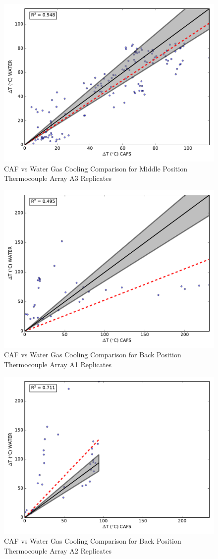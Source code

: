 \documentclass[12pt,oneside]{book}
\begin{document}
\begin{figure}[!ht]
	\includegraphics[width=.7\columnwidth]{../Figures/Gas_Cooling/Combined_mid_A3_scatter}
	\caption{CAF vs Water Gas Cooling Comparison for Middle Position Thermocouple Array A3 Replicates}
	\label{fig:CAFS_Water_A3_mid}
\end{figure}

\begin{figure}[!ht]
	\includegraphics[width=.7\columnwidth]{../Figures/Gas_Cooling/Combined_fullback_A1_scatter}
	\caption{CAF vs Water Gas Cooling Comparison for Back Position Thermocouple Array A1 Replicates}
	\label{fig:CAFS_Water_A1_back}
\end{figure}

\begin{figure}[!ht]
	\includegraphics[width=.7\columnwidth]{../Figures/Gas_Cooling/Combined_fullback_A2_scatter}
	\caption{CAF vs Water Gas Cooling Comparison for Back Position Thermocouple Array A2 Replicates}
	\label{fig:CAFS_Water_A2_back}
\end{figure}
\end{document}
